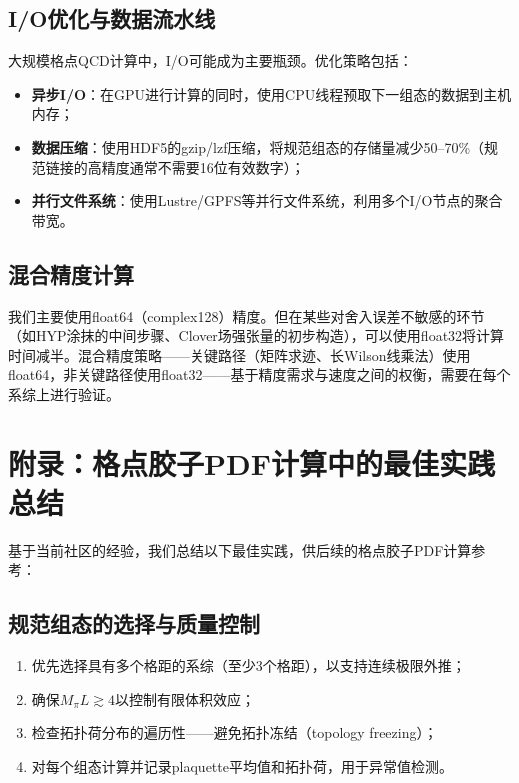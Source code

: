 \documentclass[11pt,a4paper]{ctexart}
\begin{document}
\subsection{I/O优化与数据流水线}

大规模格点QCD计算中，I/O可能成为主要瓶颈。优化策略包括：
\begin{itemize}
  \item \textbf{异步I/O}：在GPU进行计算的同时，使用CPU线程预取下一组态的数据到主机内存；
  \item \textbf{数据压缩}：使用HDF5的gzip/lzf压缩，将规范组态的存储量减少50--70\%（规范链接的高精度通常不需要16位有效数字）；
  \item \textbf{并行文件系统}：使用Lustre/GPFS等并行文件系统，利用多个I/O节点的聚合带宽。
\end{itemize}

\subsection{混合精度计算}

我们主要使用float64（complex128）精度。但在某些对舍入误差不敏感的环节（如HYP涂抹的中间步骤、Clover场强张量的初步构造），可以使用float32将计算时间减半。混合精度策略——关键路径（矩阵求迹、长Wilson线乘法）使用float64，非关键路径使用float32——基于精度需求与速度之间的权衡，需要在每个系综上进行验证。

\section{附录：格点胶子PDF计算中的最佳实践总结}

基于当前社区的经验，我们总结以下最佳实践，供后续的格点胶子PDF计算参考：

\subsection{规范组态的选择与质量控制}

\begin{enumerate}
  \item 优先选择具有多个格距的系综（至少3个格距），以支持连续极限外推；
  \item 确保$M_\pi L \gtrsim 4$以控制有限体积效应；
  \item 检查拓扑荷分布的遍历性——避免拓扑冻结（topology freezing）；
  \item 对每个组态计算并记录plaquette平均值和拓扑荷，用于异常值检测。
\end{enumerate}
\end{document}
